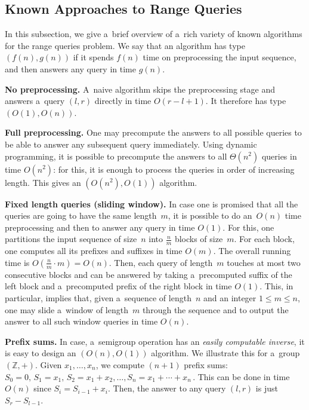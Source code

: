 \subsection{Known Approaches to Range Queries}\label{subsec:approaches}

In this subsection, we give a~brief overview of a~rich variety of known
algorithms for the range queries problem. We say that an algorithm has type
$(f(n), g(n))$ if it spends $f(n)$ time on preprocessing the input sequence,
and then answers any query in time $g(n)$.

\textbf{No preprocessing.} A~naive algorithm skips the preprocessing stage and
answers a~query $(l,r)$ directly in time $O(r-l+1)$. It therefore has type
$(O(1), O(n))$.

\textbf{Full preprocessing.} One may precompute the answers to all possible
queries to be able to answer any subsequent query immediately. Using dynamic
programming, it is possible to precompute the answers to all $\Theta(n^2)$
queries in time $O(n^2)$: for this, it is enough to process the queries in
order of increasing length. This gives an $(O(n^2), O(1))$ algorithm.

\textbf{Fixed length queries (sliding window).} In case one is promised that all
the queries are going to have the same length~$m$, it is possible to do
an~$O(n)$ time preprocessing and then to answer any query in time $O(1)$. For
this, one partitions the input sequence of size~$n$ into $\frac nm$ blocks of
size~$m$. For each block, one computes all its prefixes and suffixes in time
$O(m)$. The overall running time is $O(\frac nm \cdot m)=O(n)$. Then, each query
of length~$m$ touches at most two consecutive blocks and can be answered by
taking a~precomputed suffix of the left block and a~precomputed prefix of the
right block in time $O(1)$. This, in particular, implies that, given a~sequence
of length~$n$ and an integer $1 \le m \le n$, one may slide a~window of
length~$m$ through the sequence and to output the answer to all such window
queries in time $O(n)$.


\textbf{Prefix sums.} In case, a~semigroup operation has an \emph{easily
computable inverse}, it is easy to design an $(O(n), O(1))$ algorithm. We
illustrate this for a~group $(\mathbb{Z}, +)$. Given $x_1, \dotsc, x_n$, we
compute $(n+1)$ prefix sums:
\(S_0=0,\, S_1=x_1,\, S_2=x_1+x_2, \dotsc, S_n=x_1+\dotsb+x_n\,.\)
This can be done in time $O(n)$ since $S_i=S_{i-1}+x_i$. Then, the answer to any
query $(l,r)$ is just $S_r-S_{l-1}$.

